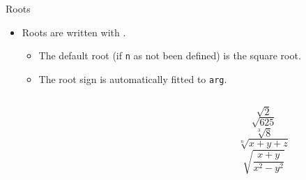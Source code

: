 \begin{frame}[fragile]{Roots}
	\begin{itemize}
		\item Roots are written with .
		\begin{itemize}
			\scriptsize
			\item The default root (if \texttt{n} as not been defined) is the square root.
			\item The root sign is automatically fitted to \texttt{arg}.
		\end{itemize}
		\begin{columns}
			\begin{column}{.4\textwidth}
			\vspace{-4.5mm}
\begin{codesource}
	
		
	
		
	
	
	
	
\end{codesource}
			\end{column}
			\begin{column}{.4\textwidth}
				\begin{equation*}					
					\sqrt{2}		
				\end{equation*}	
				\begin{equation*}
					\sqrt{625}
				\end{equation*}		
				\begin{equation*}				
					\sqrt[3]{8}				
				\end{equation*}
				\begin{equation*}
					\sqrt[n]{x + y + z}
				\end{equation*}
				\begin{equation*}
					\sqrt{\frac{x + y}{x^2 - y^2}}
				\end{equation*}
			\end{column}
		\end{columns}
	\end{itemize}
\end{frame}

